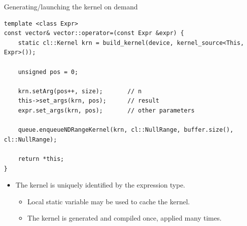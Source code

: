 \documentclass[@BEAMER_OPTIONS@]{beamer}
\begin{document}
\begin{frame}[fragile]{Generating/launching the kernel on demand}
    \begin{exampleblock}{}
        \begin{lstlisting}
template <class Expr>
const vector& vector::operator=(const Expr &expr) {
    static cl::Kernel krn = build_kernel(device, kernel_source<This, Expr>());

    unsigned pos = 0;

    krn.setArg(pos++, size);       // n
    this->set_args(krn, pos);      // result
    expr.set_args(krn, pos);       // other parameters

    queue.enqueueNDRangeKernel(krn, cl::NullRange, buffer.size(), cl::NullRange);

    return *this;
}
        \end{lstlisting}
    \end{exampleblock}
    \begin{itemize}
        \item The kernel is uniquely identified by the expression type.
            \begin{itemize}
                \item Local static variable may be used to cache the
                    kernel.
                \item The kernel is generated and compiled once, applied many
                    times.
            \end{itemize}
    \end{itemize}
\end{frame}

\note{ }
\end{document}
